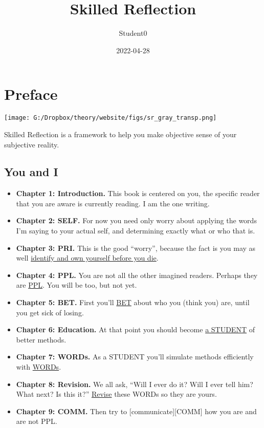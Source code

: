 \documentclass[
]{book}
\title{Skilled Reflection}
\author{Student0}
\date{2022-04-28}
\providecommand{\tightlist}{%
  \setlength{\itemsep}{0pt}\setlength{\parskip}{0pt}}
\begin{document}
\maketitle

{
\setcounter{tocdepth}{1}
\tableofcontents
}
\hypertarget{preface}{%
\chapter*{Preface}\label{preface}}

\texttt{[image: G:/Dropbox/theory/website/figs/sr\_gray\_transp.png]}

Skilled Reflection is a framework to help you make objective sense of your subjective reality.

\hypertarget{you-and-i}{%
\section{You and I}\label{you-and-i}}

\begin{itemize}
\tightlist
\item
  \textbf{Chapter 1: Introduction.} This book is centered on you, the specific reader that you are aware is currently reading. I am the one writing.
\item
  \textbf{Chapter 2: SELF.} For now you need only worry about applying the words I'm saying to your actual self, and determining exactly what or who that is.
\item
  \textbf{Chapter 3: PRI.} This is the good ``worry'', because the fact is you may as well \protect\hyperlink{priorities}{identify and own yourself before you die}.
\item
  \textbf{Chapter 4: PPL.} You are not all the other imagined readers. Perhaps they are \protect\hyperlink{ppl}{PPL}. You will be too, but not yet.
\item
  \textbf{Chapter 5: BET.} First you'll \protect\hyperlink{bet}{BET} about who you (think you) are, until you get sick of losing.
\item
  \textbf{Chapter 6: Education.} At that point you should become \protect\hyperlink{education}{a STUDENT} of better methods.
\item
  \textbf{Chapter 7: WORDs.} As a STUDENT you'll simulate methods efficiently with \protect\hyperlink{words}{WORDs}.
\item
  \textbf{Chapter 8: Revision.} We all ask, ``Will I ever do it? Will I ever tell him? What next? Is this it?'' \protect\hyperlink{revisions}{Revise} these WORDs so they are yours.
\item
  \textbf{Chapter 9: COMM.} Then try to {[}communicate{]}{[}COMM{]} how you are and are not PPL.
\end{itemize}
\end{document}
